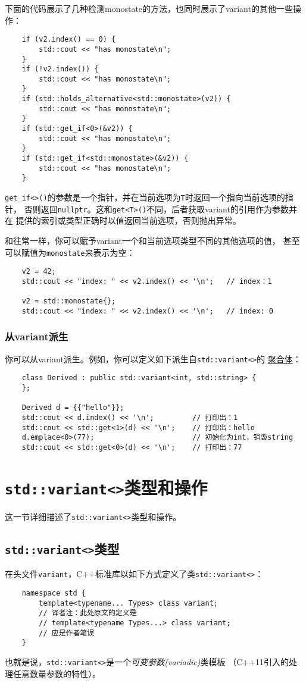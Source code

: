 下面的代码展示了几种检测monostate的方法，也同时展示了variant的其他一些操作：
\begin{lstlisting}
    if (v2.index() == 0) {
        std::cout << "has monostate\n";
    }
    if (!v2.index()) {
        std::cout << "has monostate\n";
    }
    if (std::holds_alternative<std::monostate>(v2)) {
        std::cout << "has monostate\n";
    }
    if (std::get_if<0>(&v2)) {
        std::cout << "has monostate\n";
    }
    if (std::get_if<std::monostate>(&v2)) {
        std::cout << "has monostate\n";
    }
\end{lstlisting}
\texttt{get\_if<>()}的参数是一个指针，并在当前选项为\texttt{T}时返回一个指向当前选项的指针，
否则返回\texttt{nullptr}。这和\texttt{get<T>()}不同，后者获取variant的引用作为参数并在
提供的索引或类型正确时以值返回当前选项，否则抛出异常。

和往常一样，你可以赋予variant一个和当前选项类型不同的其他选项的值，
甚至可以赋值为\texttt{monostate}来表示为空：
\begin{lstlisting}
    v2 = 42;
    std::cout << "index: " << v2.index() << '\n';   // index：1

    v2 = std::monostate{};
    std::cout << "index: " << v2.index() << '\n';   // index: 0
\end{lstlisting}

\subsubsection{从variant派生}
你可以从variant派生。例如，你可以定义如下派生自\texttt{std::variant<>}的
\hyperref[ch4]{聚合体}：
\begin{lstlisting}
    class Derived : public std::variant<int, std::string> {
    };

    Derived d = {{"hello"}};
    std::cout << d.index() << '\n';         // 打印出：1
    std::cout << std::get<1>(d) << '\n';    // 打印出：hello
    d.emplace<0>(77);                       // 初始化为int，销毁string
    std::cout << std::get<0>(d) << '\n';    // 打印出：77
\end{lstlisting}


\section{\texttt{std::variant<>}类型和操作}
这一节详细描述了\texttt{std::variant<>}类型和操作。

\subsection{\texttt{std::variant<>}类型}
在头文件\texttt{variant}，C++标准库以如下方式定义了类\texttt{std::variant<>}：
\begin{lstlisting}
    namespace std {
        template<typename... Types> class variant;
        // 译者注：此处原文的定义是
        // template<typename Types...> class variant;
        // 应是作者笔误
    }
\end{lstlisting}
也就是说，\texttt{std::variant<>}是一个\emph{可变参数(variadic)}类模板
（C++11引入的处理任意数量参数的特性）。

